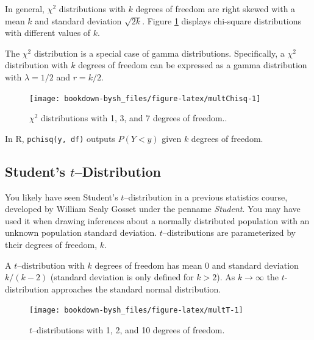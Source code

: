 \documentclass[
]{krantz}
\begin{document}
In general, \(\chi^2\) distributions with \(k\) degrees of freedom are right skewed with a mean \(k\) and standard deviation \(\sqrt{2k}\). Figure \ref{fig:multChisq} displays chi-square distributions with different values of \(k\).

The \(\chi^2\) distribution is a special case of gamma distributions. Specifically, a \(\chi^2\) distribution with \(k\) degrees of freedom can be expressed as a gamma distribution with \(\lambda = 1/2\) and \(r = k/2\).



\begin{figure}

{\centering \texttt{[image: bookdown-bysh\_files/figure-latex/multChisq-1]} 

}

\caption{\(\chi^2\) distributions with 1, 3, and 7 degrees of freedom..}\label{fig:multChisq}
\end{figure}

In R, \texttt{pchisq(y,\ df)} outputs \(P(Y < y)\) given \(k\) degrees of freedom.

\hypertarget{students-tdistribution}{%
\subsection{\texorpdfstring{Student's \(t\)--Distribution}{Student's t--Distribution}}\label{students-tdistribution}}

You likely have seen Student's \(t\)--distribution in a previous statistics course, developed by William Sealy Gosset under the penname \emph{Student}. You may have used it when drawing inferences about a normally distributed population with an unknown population standard deviation. \(t\)--distributions are parameterized by their degrees of freedom, \(k\).

A \(t\)--distribution with \(k\) degrees of freedom has mean \(0\) and standard deviation \(k/(k-2)\) (standard deviation is only defined for \(k > 2\)). As \(k \rightarrow \infty\) the \(t\)-distribution approaches the standard normal distribution.



\begin{figure}

{\centering \texttt{[image: bookdown-bysh\_files/figure-latex/multT-1]} 

}

\caption{\(t\)--distributions with 1, 2, and 10 degrees of freedom.}\label{fig:multT}
\end{figure}
\end{document}
